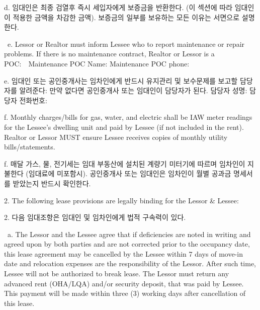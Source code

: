 \documentclass[10pt, letterpaper]{article}
\newcommand{\VMaintName}{}
\newcommand{\VMaintPhone}{}
\newcommand{\ul}[1]{\underline{\makebox[#1]{}}}
\newcommand{\uf}[2]{\underline{\makebox[#1]{\smash{#2}}}}
\newcommand{\init}{\ul{1cm}\ }
\begin{document}
\hspace{1.2cm} d. 임대인은 최종 검열후 즉시 세입자에게 보증금을 반환한다. (이 섹션에 따라 임대인이 적용한 금액을 차감한 금액). 보증금의 일부를 보유하는 모든 이유는 서면으로 설명한다.

\vspace{3pt}

\init e. Lessor or Realtor must inform Lessee who to report maintenance or repair problems. If there is no maintenance contract, Realtor or Lessor is a POC:\ \ Maintenance POC Name: \uf{3cm}{\VMaintName}\hfill Maintenance POC phone: \uf{3cm}{\VMaintPhone}

\hspace{1.2cm} e. 임대인 또는 공인중개사는 임차인에게 반드시 유지관리 및 보수문제를 보고할 담당자를 알려준다: 만약 없다면 공인중개사 또는 임대인이 담당자가 된다. 담당자 성명: \uf{3cm}{}\hfill 담당자 전화번호: \uf{3cm}{}

\vspace{3pt}

\hspace{1.2cm} f. Monthly charges/bills for gas, water, and electric shall be IAW meter readings for the Lessee's dwelling unit and paid by Lessee (if not included in the rent). Realtor or Lessor MUST ensure Lessee receives copies of monthly utility bills/statements.

\hspace{1.2cm} f. 매달 가스, 물, 전기세는 임대 부동산에 설치된 계량기 미터기에 따르며 임차인이 지불한다 (임대료에 미포함시). 공인중개사 또는 임대인은 임차인이 월별 공과금 명세서를 받았는지 반드시 확인한다.

\vspace{4pt}


\hspace{1.2cm} 2. The following lease provisions are legally binding for the Lessor \& Lessee:

\hspace{1.2cm} 2. 다음 임대조항은 임대인 및 임차인에게 법적 구속력이 있다.

\vspace{3pt}

\init a. The Lessor and the Lessee agree that if deficiencies are noted in writing and agreed upon by both parties and are not corrected prior to the occupancy date, this lease agreement may be cancelled by the Lessee within 7 days of move-in date and relocation expenses are the responsibility of the Lessor. After such time, Lessee will not be authorized to break lease. The Lessor must return any advanced rent (OHA/LQA) and/or security deposit, that was paid by Lessee. This payment will be made within three (3) working days after cancellation of this lease.
\end{document}
